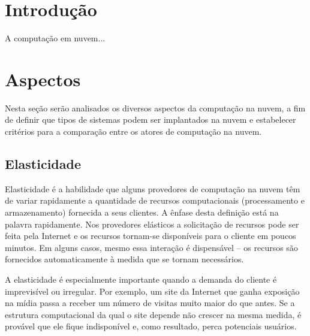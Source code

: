 
\section{Introdução}
A computação em nuvem... \cite{acm:s3,wired:end,akita,teste}

\section{Aspectos}

Nesta seção serão analisados os diversos aspectos da computação na nuvem, a fim de definir que tipos de sistemas podem ser implantados na nuvem e estabelecer critérios para a comparação entre os atores de computação na nuvem.

\subsection{Elasticidade}


Elasticidade é a habilidade que alguns provedores de computação na nuvem têm de variar rapidamente a quantidade de recursos computacionais (processamento e armazenamento) fornecida a seus clientes. A ênfase desta definição está na palavra rapidamente. Nos provedores elásticos a solicitação de recursos pode ser feita pela Internet e os recursos tornam-se disponíveis para o cliente em poucos minutos. Em alguns casos, mesmo essa interação é dispensável -- os recursos são fornecidos automaticamente à medida que se tornam necessários.


A elasticidade é especialmente importante quando a demanda do cliente é imprevisível ou irregular. Por exemplo, um site da Internet que ganha exposição na mídia passa a receber um número de visitas muito maior do que antes. Se a estrutura computacional da qual o site depende não crescer na mesma medida, é provável que ele fique indisponível e, como resultado, perca potenciais usuários.


